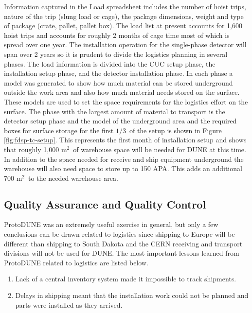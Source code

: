 Information captured in the Load spreadsheet includes the number of hoist trips, nature of the trip (slung load or cage), the package dimensions, weight and type of package (crate, pallet, pallet box). The load list at present accounts for 1,600 hoist trips and accounts for roughly 2 months of cage time most of which is spread over one year. The installation operation for the single-phase detector will span over 2 years so it is prudent to divide the logistics planning in several phases. The load information is divided into the CUC setup phase, the installation setup phase, and the detector installation phase. In each phase a model was generated to show how much material can be stored underground outside the work area and also how much material needs stored on the surface. These models are used to set the space requirements for the logistics effort on the surface. The phase with the largest amount of material to transport is the detector setup phase and the model of the underground area and the required boxes for surface storage for the first $1/3$\ of the setup is shown in Figure \ref{fig:fdsp-tc-setup}. This represents the first month of installation setup and shows that roughly 1,000 m$^2$\ of warehouse space will be needed for DUNE at this time. In addition to the space needed for receive and ship equipment underground the warehouse will also need space to store up to 150 APA. This adds an additional 700 m$^2$\ to the needed warehouse area. 


\subsection{Quality Assurance and Quality Control}
\label{sec:fdsp-tc-itf-qaqc}


ProtoDUNE was an extremely useful exercise in general, but only a few conclusions can be drawn related to logistics since shipping to Europe will be different than shipping to South Dakota and the CERN receiving and transport divisions will not be used for DUNE. The most important lessons learned from ProtoDUNE related to logistics are listed below.
\begin{enumerate}
\item Lack of a central inventory system made it impossible to track shipments.
\item Delays in shipping meant that the installation work could not be planned and parts were installed as they arrived. 
\end{enumerate}


